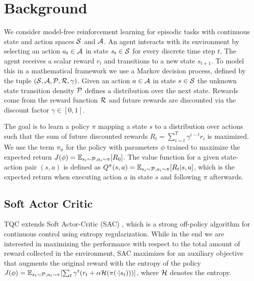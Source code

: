\section{Background}






We consider model-free reinforcement learning for episodic tasks with continuous state and action spaces $\mathcal{S}$ and $\mathcal{A}$. An agent interacts with its environment by selecting an action $a_t \in \mathcal{A}$ in state $s_t \in \mathcal{S}$ for every discrete time step $t$. The agent receives a scalar reward $r_t$ and transitions to a new state $s_{t+1}$.
To model this in a mathematical framework we use a Markov decision process, defined by the tuple 
$(\mathcal{S}, \mathcal{A}, \mathcal{P}, \mathcal{R}, \gamma)$. Given an action $a \in \mathcal{A}$ in state $s \in \mathcal{S}$ the unknown state transition density $\mathcal{P}$ defines a distribution over the next state.
Rewards come from the reward function $\mathcal{R}$ and future rewards are discounted via the discount factor $\gamma \in [0, 1]$.

The goal is to learn a policy $\pi$ mapping a state $s$ to a distribution over actions such that the sum of future discounted rewards $R_t = \sum_{i=t}^{T} \gamma^{i-t} r_i$ is maximized.
We use the term $\pi_\phi$ for the policy with parameters $\phi$ trained to maximize the expected return 
$J(\phi) = \operatorname*{\mathbb{E}}_{s_i \sim \mathcal{P} , a_i \sim \pi} [R_0]$.
The value function for a given state-action pair $(s,a)$ is defined as 
$Q^\pi (s,a) = \operatorname*{\mathbb{E}}_{s_i \sim \mathcal{P} , a_i \sim \pi} [ R_t |s,a]$, which is the expected return when executing action $a$ in state $s$ and following $\pi$ afterwards.



\subsection{Soft Actor Critic}
TQC extends Soft Actor-Critic (SAC) \cite{SAC}, which is a strong off-policy algorithm for continuous control using entropy regularization.
While in the end we are interested in maximizing the performance with respect to the total amount of reward collected in the environment, SAC maximizes for an auxiliary objective that augments the original reward with the entropy of the policy
$J(\phi) = \operatorname*{\mathbb{E}}_{s_t \sim \mathcal{P} , a_t \sim \pi} [ \sum_t \gamma^{t} (r_t + \alpha \mathcal{H} (\pi(\cdot | s_t)))   ]$, where $\mathcal{H}$ denotes the entropy. 

